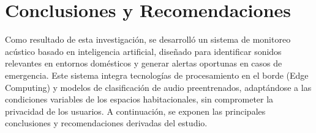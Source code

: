 \chapter{Conclusiones y Recomendaciones}

Como resultado de esta investigación, se desarrolló un sistema de monitoreo acústico basado en inteligencia artificial, diseñado para identificar sonidos relevantes en entornos domésticos y generar alertas oportunas en casos de emergencia. Este sistema integra tecnologías de procesamiento en el borde (Edge Computing) y modelos de clasificación de audio preentrenados, adaptándose a las condiciones variables de los espacios habitacionales, sin comprometer la privacidad de los usuarios. A continuación, se exponen las principales conclusiones y recomendaciones derivadas del estudio.





